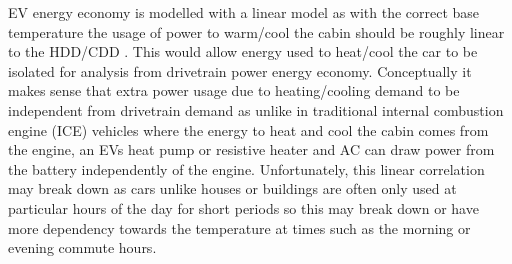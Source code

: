 \documentclass[
]{article}
\begin{document}
EV energy economy is modelled with a linear model as with the correct
base temperature the usage of power to warm/cool the cabin should be
roughly linear to the HDD/CDD \cite{HDD_est}. This would allow energy
used to heat/cool the car to be isolated for analysis from drivetrain
power energy economy. Conceptually it makes sense that extra power usage
due to heating/cooling demand to be independent from drivetrain demand
as unlike in traditional internal combustion engine (ICE) vehicles where
the energy to heat and cool the cabin comes from the engine, an EVs heat
pump or resistive heater and AC can draw power from the battery
independently of the engine. Unfortunately, this linear correlation may
break down as cars unlike houses or buildings are often only used at
particular hours of the day for short periods so this may break down or
have more dependency towards the temperature at times such as the
morning or evening commute hours.
\end{document}
